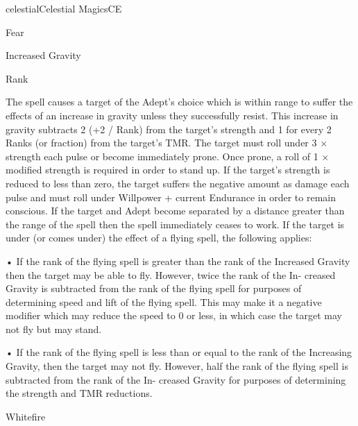 \begin{College}[1.3]{celestial}{Celestial Magics}{CE}
\begin{spell}[S-7]{Fear }
\begin{effects}
\end{effects}
\end{spell}

\begin{spell}[S-8]{Increased Gravity }

Rank 
\begin{effects}
 The  spell  causes  a  target  of  the  Adept’s 
choice which is within range to suffer the effects of 
an  increase  in  gravity  unless  they  successfully 
resist.  This  increase  in  gravity  subtracts  2  (+2  / 
Rank) from the target’s strength and 1 for every 2 
Ranks  (or  fraction)  from  the  target’s  TMR.  The 
target  must  roll  under  3  ×  strength  each  pulse  or 
become immediately prone. Once prone, a roll of 1 
×  modified  strength  is  required  in  order  to  stand 
up.  If  the  target’s  strength  is  reduced  to  less  than 
zero,  the  target  suffers  the  negative  amount  as 
damage each pulse and must roll under Willpower 
+ current Endurance in order to remain conscious. 
If  the  target  and  Adept  become  separated  by  a 
distance greater than the range of the spell then the 
spell  immediately  ceases  to  work.  If  the  target  is 
under (or comes under) the effect of a flying spell, 
the following applies:  

•  If  the  rank  of  the  flying  spell  is  greater  than  the 
rank  of  the  Increased  Gravity  then  the  target  may 
be  able  to  fly.  However,  twice  the  rank  of  the  In-
creased  Gravity  is  subtracted  from  the  rank  of  the 
flying spell for purposes of determining speed and 
lift of the flying spell. This may make it a negative 
modifier which may reduce the speed to 0 or  less, 
in which case the target may not fly but may stand.  

• If the rank of the flying spell is less than or equal 
to  the  rank  of  the  Increasing  Gravity,  then  the 
target  may  not  fly.  However,  half  the  rank  of  the 
flying  spell  is  subtracted  from  the  rank  of  the  In-
creased  Gravity  for  purposes  of  determining  the 
strength and TMR reductions. 

\end{effects}
\end{spell}

\begin{spell}[S-9]{Whitefire }


\end{spell}
\end{College}
